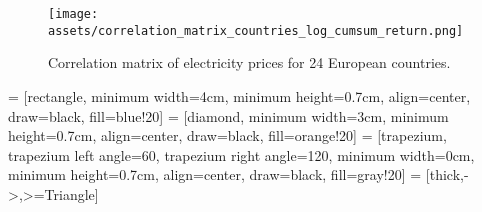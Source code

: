 
\begin{figure}[h]
    \centering
    \texttt{[image: assets/correlation\_matrix\_countries\_log\_cumsum\_return.png]}
    \caption{Correlation matrix of electricity prices for 24 European countries.}
    \label{fig:correlation_matrix}
\end{figure}


 = [rectangle, minimum width=4cm, 
    minimum height=0.7cm, align=center, draw=black, fill=blue!20]
 = [diamond, minimum width=3cm, 
    minimum height=0.7cm, align=center, draw=black, fill=orange!20]
 = [trapezium, trapezium left angle=60, trapezium right angle=120, minimum width=0cm, minimum height=0.7cm, align=center, draw=black, fill=gray!20]
 = [thick,->,>=Triangle]

